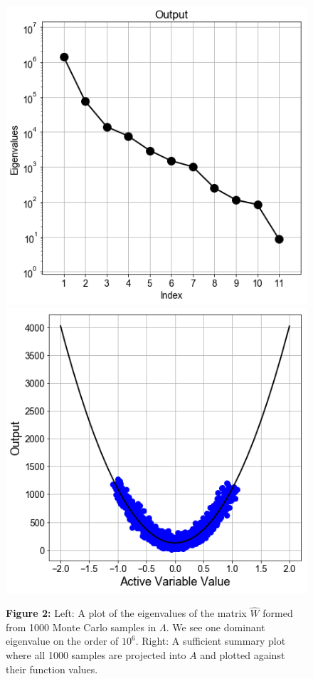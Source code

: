 \documentclass{amsart}
\begin{document}
\begin{figure} 
\includegraphics[scale=0.3]{eigs.png} \includegraphics[scale=0.3]{surr.png}

\textbf{Figure 2:} Left: A plot of the eigenvalues of the matrix $\hat{W}$ formed from 1000 Monte Carlo samples in $\Lambda$. We see one dominant eigenvalue on the order of $10^6$. Right: A sufficient summary plot where all 1000 samples are projected into $A$ and plotted against their function values.
\end{figure} 
\end{document}
